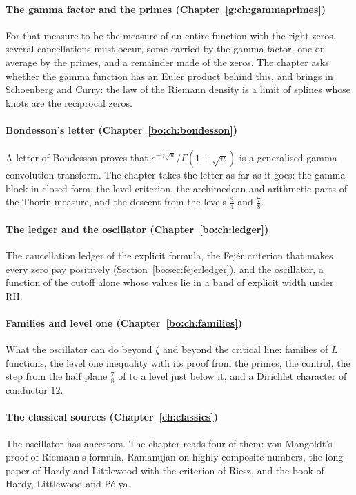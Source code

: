 \paragraph{The gamma factor and the primes (Chapter~\ref{g:ch:gammaprimes})} For that measure to be the measure of an entire function with the right zeros, several cancellations must occur, some carried by the gamma factor, one on average by the primes, and a remainder made of the zeros. The chapter asks whether the gamma function has an Euler product behind this, and brings in Schoenberg and Curry: the law of the Riemann density is a limit of splines whose knots are the reciprocal zeros.

\paragraph{Bondesson's letter (Chapter~\ref{bo:ch:bondesson})} A letter of Bondesson proves that $e^{-\gamma\sqrt u}/\Gamma(1+\sqrt u)$ is a generalised gamma convolution transform. The chapter takes the letter as far as it goes: the gamma block in closed form, the level criterion, the archimedean and arithmetic parts of the Thorin measure, and the descent from the levels $\frac34$ and $\frac78$.

\paragraph{The ledger and the oscillator (Chapter~\ref{bo:ch:ledger})} The cancellation ledger of the explicit formula, the Fej\'er criterion that makes every zero pay positively (Section~\ref{bo:sec:fejerledger}), and the oscillator, a function of the cutoff alone whose values lie in a band of explicit width under RH.

\paragraph{Families and level one (Chapter~\ref{bo:ch:families})} What the oscillator can do beyond $\zeta$ and beyond the critical line: families of $L$ functions, the level one inequality with its proof from the primes, the control, the step from the half plane $\frac78$ of \cite{OAI26a} to a level just below it, and a Dirichlet character of conductor $12$.

\paragraph{The classical sources (Chapter~\ref{ch:classics})} The oscillator has ancestors. The chapter reads four of them: von Mangoldt's proof of Riemann's formula, Ramanujan on highly composite numbers, the long paper of Hardy and Littlewood with the criterion of Riesz, and the book of Hardy, Littlewood and P\'olya.

